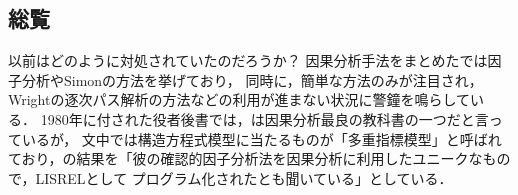 \documentclass[uplatex,dvipdfmx]{jsreport}
\begin{document}
\subsection{総覧}

\begin{tcolorbox}[colframe=ForestGreen, colback=ForestGreen!10!white,breakable,colbacktitle=ForestGreen!40!white,coltitle=black,fonttitle=\bfseries\sffamily,
title=]
    以前はどのように対処されていたのだろうか？
    因果分析手法をまとめた\cite{Asher83-Causal}では因子分析やSimonの方法を挙げており，
    同時に，簡単な方法のみが注目され，Wrightの逐次パス解析の方法などの利用が進まない状況に警鐘を鳴らしている．
    1980年に付された役者後書では，\cite{Asher83-Causal}は因果分析最良の教科書の一つだと言っているが，
    文中では構造方程式模型に当たるものが「多重指標模型」と呼ばれており，\cite{Joreskog70}の結果を「彼の確認的因子分析法を因果分析に利用したユニークなもので，LISRELとして
    プログラム化されたとも聞いている」としている．
\end{tcolorbox}
\end{document}
